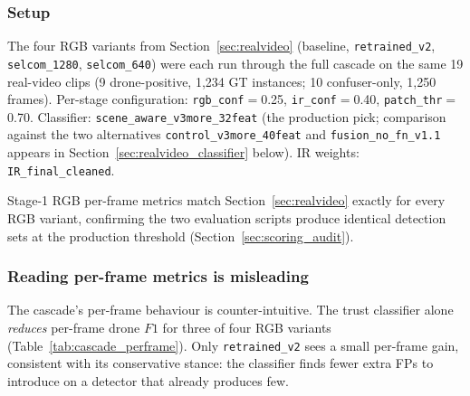\subsubsection{Setup}
The four RGB variants from Section~\ref{sec:realvideo} (baseline, \texttt{retrained\_v2}, \texttt{selcom\_1280}, \texttt{selcom\_640}) were each run through the full cascade on the same 19 real-video clips (9 drone-positive, 1{,}234 GT instances; 10 confuser-only, 1{,}250 frames). Per-stage configuration: \texttt{rgb\_conf}$=$0.25, \texttt{ir\_conf}$=$0.40, \texttt{patch\_thr}$=$0.70. Classifier: \texttt{scene\_aware\_v3more\_32feat} (the production pick; comparison against the two alternatives \texttt{control\_v3more\_40feat} and \texttt{fusion\_no\_fn\_v1.1} appears in Section~\ref{sec:realvideo_classifier} below). IR weights: \texttt{IR\_final\_cleaned}.

Stage-1 RGB per-frame metrics match Section~\ref{sec:realvideo} exactly for every RGB variant, confirming the two evaluation scripts produce identical detection sets at the production threshold (Section~\ref{sec:scoring_audit}).

\subsubsection{Reading per-frame metrics is misleading}

The cascade's per-frame behaviour is counter-intuitive. The trust classifier alone \emph{reduces} per-frame drone $F1$ for three of four RGB variants (Table~\ref{tab:cascade_perframe}). Only \texttt{retrained\_v2} sees a small per-frame gain, consistent with its conservative stance: the classifier finds fewer extra FPs to introduce on a detector that already produces few.

